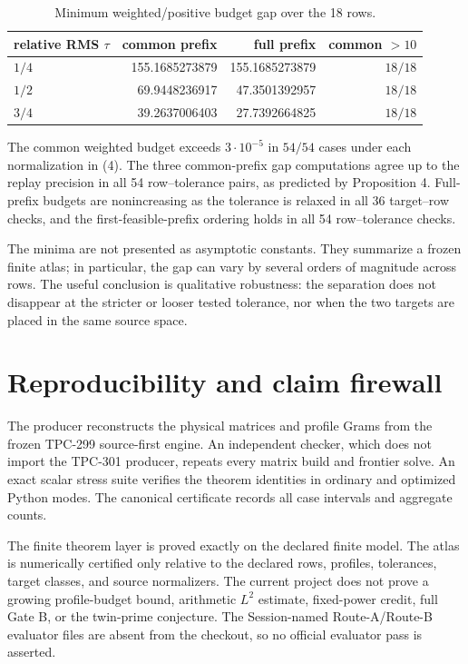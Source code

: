 \documentclass[11pt]{article}
\begin{document}
\begin{table}[t]
\centering
\small
\caption{Minimum weighted/positive budget gap over the 18 rows.}
\label{tab:gap}
\begin{tabular}{lrrr}
\toprule
relative RMS $\tau$ & common prefix & full prefix & common $>10$\\
\midrule
$1/4$ & 155.1685273879 & 155.1685273879 & $18/18$\\
$1/2$ & 69.9448236917 & 47.3501392957 & $18/18$\\
$3/4$ & 39.2637006403 & 27.7392664825 & $18/18$\\
\bottomrule
\end{tabular}
\end{table}

The common weighted budget exceeds $3\cdot10^{-5}$ in $54/54$ cases under
each normalization in (4).  The three common-prefix gap computations agree
up to the replay precision in all 54 row--tolerance pairs, as predicted by
Proposition 4.  Full-prefix budgets are nonincreasing as the tolerance is
relaxed in all 36 target--row checks, and the first-feasible-prefix ordering
holds in all 54 row--tolerance checks.

The minima are not presented as asymptotic constants.  They summarize a
frozen finite atlas; in particular, the gap can vary by several orders of
magnitude across rows.  The useful conclusion is qualitative robustness:
the separation does not disappear at the stricter or looser tested
tolerance, nor when the two targets are placed in the same source space.

\section{Reproducibility and claim firewall}

The producer reconstructs the physical matrices and profile Grams from the
frozen TPC-299 source-first engine.  An independent checker, which does not
import the TPC-301 producer, repeats every matrix build and frontier solve.
An exact scalar stress suite verifies the theorem identities in ordinary and
optimized Python modes.  The canonical certificate records all case
intervals and aggregate counts.

The finite theorem layer is proved exactly on the declared finite model.  The
atlas is numerically certified only relative to the declared rows, profiles,
tolerances, target classes, and source normalizers.  The current project
does not prove a growing profile-budget bound, arithmetic $L^2$ estimate,
fixed-power credit, full Gate B, or the twin-prime conjecture.  The
Session-named Route-A/Route-B evaluator files are absent from the checkout,
so no official evaluator pass is asserted.
\end{document}
